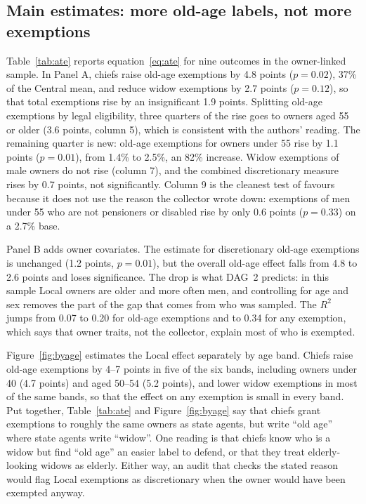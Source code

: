 \documentclass[11pt]{article}
\newcommand{\tabpath}{../tables}
\begin{document}


\subsection{Main estimates: more old-age labels, not more exemptions}



Table~\ref{tab:ate} reports equation~\eqref{eq:ate} for nine outcomes in the owner-linked sample. In Panel A, chiefs raise old-age exemptions by 4.8 points ($p=0.02$), 37\% of the Central mean, and reduce widow exemptions by 2.7 points ($p=0.12$), so that total exemptions rise by an insignificant 1.9 points. Splitting old-age exemptions by legal eligibility, three quarters of the rise goes to owners aged 55 or older (3.6 points, column 5), which is consistent with the authors' reading. The remaining quarter is new: old-age exemptions for owners under 55 rise by 1.1 points ($p=0.01$), from 1.4\% to 2.5\%, an 82\% increase. Widow exemptions of male owners do not rise (column 7), and the combined discretionary measure rises by 0.7 points, not significantly. Column 9 is the cleanest test of favours because it does not use the reason the collector wrote down: exemptions of men under 55 who are not pensioners or disabled rise by only 0.6 points ($p=0.33$) on a 2.7\% base.

Panel B adds owner covariates. The estimate for discretionary old-age exemptions is unchanged (1.2 points, $p=0.01$), but the overall old-age effect falls from 4.8 to 2.6 points and loses significance. The drop is what DAG~2 predicts: in this sample Local owners are older and more often men, and controlling for age and sex removes the part of the gap that comes from who was sampled. The $R^2$ jumps from 0.07 to 0.20 for old-age exemptions and to 0.34 for any exemption, which says that owner traits, not the collector, explain most of who is exempted.

Figure~\ref{fig:byage} estimates the Local effect separately by age band. Chiefs raise old-age exemptions by 4--7 points in five of the six bands, including owners under 40 (4.7 points) and aged 50--54 (5.2 points), and lower widow exemptions in most of the same bands, so that the effect on any exemption is small in every band. Put together, Table~\ref{tab:ate} and Figure~\ref{fig:byage} say that chiefs grant exemptions to roughly the same owners as state agents, but write ``old age'' where state agents write ``widow''. One reading is that chiefs know who is a widow but find ``old age'' an easier label to defend, or that they treat elderly-looking widows as elderly. Either way, an audit that checks the stated reason would flag Local exemptions as discretionary when the owner would have been exempted anyway.
\end{document}
